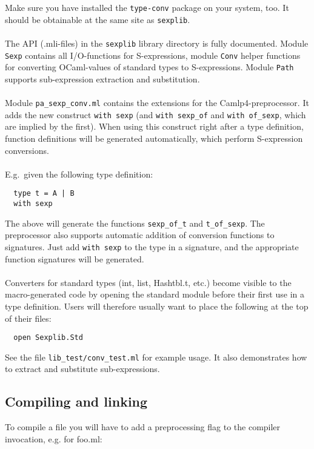 \documentclass[a4paper]{article}
\begin{document}
Make sure you have installed the \verb=type-conv= package on your system,
too.  It should be obtainable at the same site as \verb=sexplib=.\\
\\
The API (.mli-files) in the \verb=sexplib= library directory is
fully documented.  Module \verb=Sexp= contains all I/O-functions for
S-expressions, module \verb=Conv= helper functions for converting
OCaml-values of standard types to S-expressions.  Module \verb=Path=
supports sub-expression extraction and substitution.\\
\\
Module \verb=pa_sexp_conv.ml= contains the extensions for the
Camlp4-preprocessor.  It adds the new construct \verb=with sexp=
(and \verb=with sexp_of= and \verb=with of_sexp=, which are implied by
the first).  When using this construct right after a type definition,
function definitions will be generated automatically, which perform
S-expression conversions.\\
\\
E.g.\ given the following type definition:

\begin{verbatim}
  type t = A | B
  with sexp
\end{verbatim}

The above will generate the functions \verb=sexp_of_t= and
\verb=t_of_sexp=.  The preprocessor also supports automatic addition
of conversion functions to signatures.  Just add \verb=with sexp= to
the type in a signature, and the appropriate function signatures will
be generated.\\
\\
Converters for standard types (int, list, Hashtbl.t, etc.) become visible to
the macro-generated code by opening the standard module before their first
use in a type definition.  Users will therefore usually want to place the
following at the top of their files:

\begin{verbatim}
  open Sexplib.Std
\end{verbatim}

See the file \verb=lib_test/conv_test.ml= for example usage.  It also
demonstrates how to extract and substitute sub-expressions.

\subsection{Compiling and linking}

To compile a file you will have to add a preprocessing flag to the
compiler invocation, e.g. for foo.ml:
\end{document}
